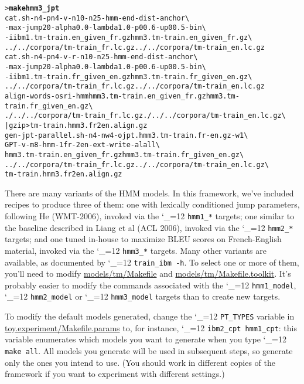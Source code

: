 \documentclass[11pt,letterpaper]{article}
\newcommand{\bs}{\textbackslash{}}
\def\code{\begingroup\catcode`\_=12 \codex}
\newcommand{\codex}[1]{\texttt{#1}\endgroup}
\begin{document}
\begin{small}
\begin{alltt}
   > \textbf{make hmm3_jpt}
   cat.sh -n 4 -pn 4 -v -n1 0 -n2 5 -hmm -end-dist -anchor \bs
      -max-jump 20 -alpha 0.0 -lambda 1.0 -p0 0.6 -up0 0.5 -bin \bs
      -i ibm1.tm-train.en_given_fr.gz hmm3.tm-train.en_given_fr.gz \bs
      ../../corpora/tm-train_fr.lc.gz ../../corpora/tm-train_en.lc.gz
   cat.sh -n 4 -pn 4 -v -r -n1 0 -n2 5 -hmm -end-dist -anchor \bs
      -max-jump 20 -alpha 0.0 -lambda 1.0 -p0 0.6 -up0 0.5 -bin \bs
      -i ibm1.tm-train.fr_given_en.gz hmm3.tm-train.fr_given_en.gz \bs
      ../../corpora/tm-train_fr.lc.gz ../../corpora/tm-train_en.lc.gz
   align-words -o sri -hmm hmm3.tm-train.en_given_fr.gz hmm3.tm-train.fr_given_en.gz \bs
      ./../../corpora/tm-train_fr.lc.gz ./../../corpora/tm-train_en.lc.gz \bs
      | gzip > tm-train.hmm3.fr2en.align.gz
   gen-jpt-parallel.sh -n 4 -nw 4 -o jpt.hmm3.tm-train.fr-en.gz -w 1 \bs
      GPT -v -m 8 -hmm -1 fr -2 en -ext -write-al all \bs
      hmm3.tm-train.en_given_fr.gz hmm3.tm-train.fr_given_en.gz \bs
      ../../corpora/tm-train_fr.lc.gz ../../corpora/tm-train_en.lc.gz \bs
      tm-train.hmm3.fr2en.align.gz
\end{alltt}
\end{small}

There are many variants of the HMM models.  In this framework, we've included
recipes to produce three of them: one with lexically conditioned jump
parameters, following He (WMT-2006), invoked via the \code{hmm1_*} targets;
one similar to the baseline described in Liang et al (ACL 2006), invoked via
the \code{hmm2_*} targets; and one tuned in-house to maximize BLEU scores on
French-English material, invoked via the \code{hmm3_*} targets.  Many other
variants are available, as documented by \code{train_ibm -h}. To select one or
more of them, you'll need to modify \url{models/tm/Makefile} and
\url{models/tm/Makefile.toolkit}. It's probably easier to modify the commands
associated with the \code{hmm1_model}, \code{hmm2_model} or \code{hmm3_model}
targets than to create new targets.

To modify the default models generated, change the \code{PT_TYPES} variable
in \url{toy.experiment/Makefile.params} to, for instance, \code{ibm2_cpt
hmm1_cpt}: this variable enumerates which models you want to generate when you
type \code{make all}. All models you generate will be used in subsequent
steps, so generate only the ones you intend to use. (You should work in
different copies of the framework if you want to experiment with different
settings.)
\end{document}
